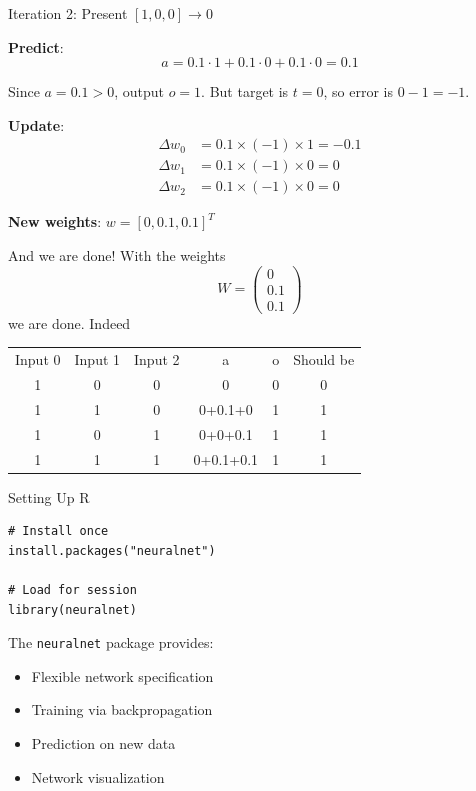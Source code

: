 \documentclass[aspectratio=169]{beamer}\usepackage[]{graphicx}\usepackage[]{xcolor}
\begin{document}
\begin{frame}{Iteration 2: Present $[1, 0, 0] \to 0$}

\textbf{Predict}:
\[
a = 0.1 \cdot 1 + 0.1 \cdot 0 + 0.1 \cdot 0 = 0.1
\]

Since $a = 0.1 > 0$, output $o = 1$. But target is $t = 0$, so error is $0 - 1 = -1$.

\vfill
\textbf{Update}:
\begin{align*}
\Delta w_0 &= 0.1 \times (-1) \times 1 = -0.1 \\
\Delta w_1 &= 0.1 \times (-1) \times 0 = 0 \\
\Delta w_2 &= 0.1 \times (-1) \times 0 = 0
\end{align*}

\vfill
\textbf{New weights}: $w = [0, 0.1, 0.1]^T$ 
\end{frame}


\begin{frame}{And we are done!}
    With the weights
    \[
        W=\begin{pmatrix}
            0\\ 0.1\\ 0.1
        \end{pmatrix}
    \]
    we are done. Indeed
    \begin{center}
        \begin{tabular}{cccccc}
            Input 0 & Input 1 & Input 2 & a & o & Should be \\
            1 & 0 & 0 & 0 & 0 & 0 \\
            1 & 1 & 0 & 0+0.1+0 & 1 & 1 \\
            1 & 0 & 1 & 0+0+0.1 & 1 & 1 \\
            1 & 1 & 1 & 0+0.1+0.1 & 1 & 1 \\
        \end{tabular}
    \end{center}    
\end{frame}

\begin{frame}[fragile]{Setting Up R}

\begin{lstlisting}
# Install once
install.packages("neuralnet")

# Load for session
library(neuralnet)
\end{lstlisting}

\vfill
The \texttt{neuralnet} package provides:
\begin{itemize}
    \item Flexible network specification
    \item Training via backpropagation
    \item Prediction on new data
    \item Network visualization
\end{itemize}
\end{frame}
\end{document}
